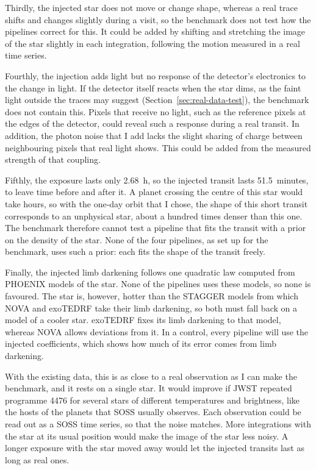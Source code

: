 Thirdly, the injected star does not move or change shape, whereas a real
trace shifts and changes slightly during a visit, so the benchmark does not
test how the pipelines correct for this. It could be added by shifting and
stretching the image of the star slightly in each integration, following the
motion measured in a real time series.

Fourthly, the injection adds light but no response of the detector's
electronics to the change in light. If the detector itself reacts when the star
dims, as the faint light outside the traces may suggest
(Section~\ref{sec:real-data-test}), the benchmark does not contain this. Pixels
that receive no light, such as the reference pixels at the edges of the
detector, could reveal such a response during a real transit. In addition, the
photon noise that I add lacks the slight sharing of charge between neighbouring
pixels that real light shows. This could be added from the measured strength
of that coupling.

Fifthly, the exposure lasts only 2.68~h, so the injected transit lasts
51.5~minutes, to leave time before and after it. A planet crossing the centre
of this star would take hours, so with the one-day orbit that I chose, the
shape of this short transit corresponds to an unphysical star, about a hundred
times denser than this one. The benchmark therefore cannot test a pipeline that
fits the transit with a prior on the density of the star. None of the four
pipelines, as set up for the benchmark, uses such a prior: each fits the shape
of the transit freely.

Finally, the injected limb darkening follows one quadratic law computed from
PHOENIX models of the star. None of the pipelines uses these models, so none is
favoured. The star is, however, hotter than the STAGGER models
\citep{MagicEtAl2015} from which NOVA and exoTEDRF take their limb darkening,
so both must fall back on a model of a cooler star. exoTEDRF fixes its limb
darkening to that model, whereas NOVA allows deviations from it. In a control,
every pipeline will use the injected coefficients, which shows how much of its
error comes from limb darkening.

With the existing data, this is as close to a real observation as I can make
the benchmark, and it rests on a single star. It would improve if JWST
repeated programme 4476 for several stars of different temperatures and
brightness, like the hosts of the planets that SOSS usually observes. Each
observation could be read out as a SOSS time series, so that the noise
matches. More integrations with the star at its usual position would make the
image of the star less noisy. A longer exposure with the star moved away would
let the injected transits last as long as real ones.
